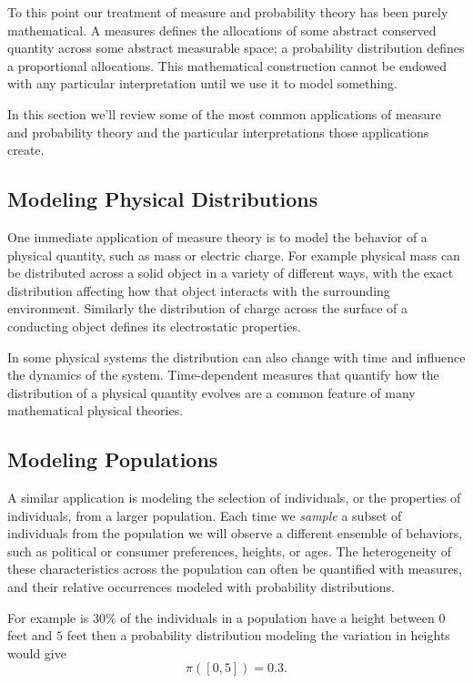 \documentclass[
  letterpaper,
  DIV=11,
  numbers=noendperiod]{scrartcl}
\begin{document}
To this point our treatment of measure and probability theory has been
purely mathematical. A measures defines the allocations of some abstract
conserved quantity across some abstract measurable space; a probability
distribution defines a proportional allocations. This mathematical
construction cannot be endowed with any particular interpretation until
we use it to model something.

In this section we'll review some of the most common applications of
measure and probability theory and the particular interpretations those
applications create.

\hypertarget{modeling-physical-distributions}{%
\subsection{Modeling Physical
Distributions}\label{modeling-physical-distributions}}

One immediate application of measure theory is to model the behavior of
a physical quantity, such as mass or electric charge. For example
physical mass can be distributed across a solid object in a variety of
different ways, with the exact distribution affecting how that object
interacts with the surrounding environment. Similarly the distribution
of charge across the surface of a conducting object defines its
electrostatic properties.

In some physical systems the distribution can also change with time and
influence the dynamics of the system. Time-dependent measures that
quantify how the distribution of a physical quantity evolves are a
common feature of many mathematical physical theories.

\hypertarget{modeling-populations}{%
\subsection{Modeling Populations}\label{modeling-populations}}

A similar application is modeling the selection of individuals, or the
properties of individuals, from a larger population. Each time we
\emph{sample} a subset of individuals from the population we will
observe a different ensemble of behaviors, such as political or consumer
preferences, heights, or ages. The heterogeneity of these
characteristics across the population can often be quantified with
measures, and their relative occurrences modeled with probability
distributions.

For example is \(30\%\) of the individuals in a population have a height
between \(0\) feet and \(5\) feet then a probability distribution
modeling the variation in heights would give \[
\pi([0, 5]) = 0.3.
\]
\end{document}
